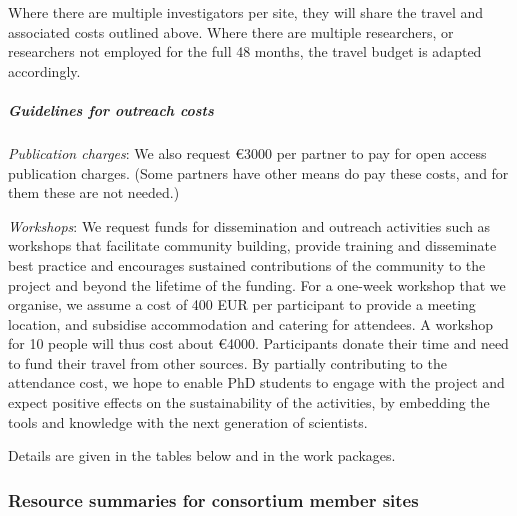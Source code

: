 Where there are multiple investigators per site, they will share the
travel and associated costs outlined above. Where there are multiple
researchers, or researchers not employed for the full 48 months, the
travel budget is adapted accordingly.



\subparagraph{Guidelines for outreach costs}

\label{sect:budget-outreach-publication-charges}
\emph{Publication charges}: We also request \euro{3000} per partner to pay for open
access publication charges.  (Some partners have other means do pay
these costs, and for them these are not needed.)

\label{sect:budget-outreach-workshops}
\emph{Workshops}: We request funds for dissemination and outreach
activities such as workshops that facilitate community building,
provide training and disseminate best practice and encourages
sustained contributions of the community to the project and beyond the
lifetime of the funding. For a one-week workshop that we organise, we
assume a cost of 400 EUR per participant to provide a meeting
location, and subsidise accommodation and catering for attendees. A
workshop for 10 people will thus cost about \euro{4000}. Participants
donate their time and need to fund their travel from other sources. By
partially contributing to the attendance cost, we hope to enable PhD
students to engage with the project and expect positive effects on the
sustainability of the activities, by embedding the tools and knowledge
with the next generation of scientists.

Details are given in the tables below and in the work packages.

\bigskip


 \subsubsection{Resource summaries for consortium member sites}
 \label{resources.summary}

